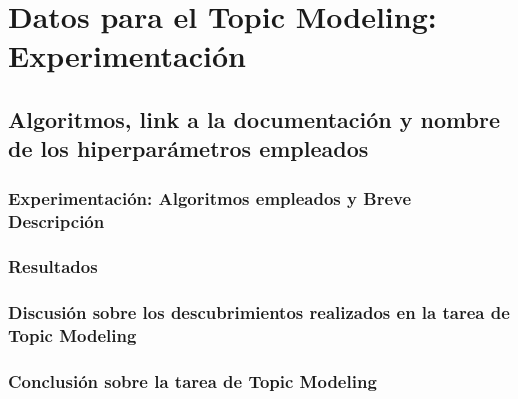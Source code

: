 \documentclass{report}
\begin{document}
    \chapter{Datos para el Topic Modeling: Experimentación}
        \section{Algoritmos, link a la documentación y nombre de los hiperparámetros empleados}
            \subsection{Experimentación: Algoritmos empleados y Breve Descripción}
            \subsection{Resultados}
            \subsection{Discusión sobre los descubrimientos realizados en la tarea de Topic Modeling}
            \subsection{Conclusión sobre la tarea de Topic Modeling}
\end{document}

